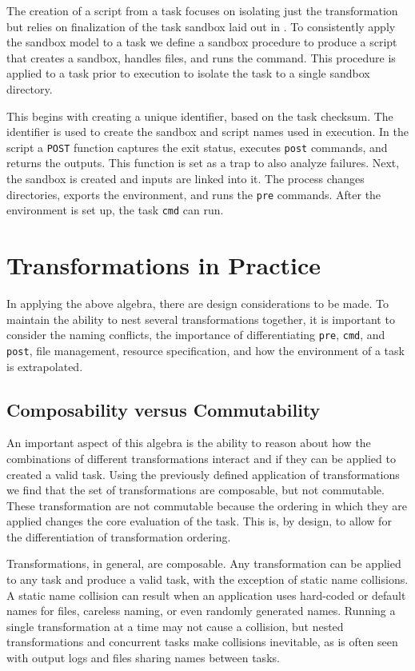 \documentclass[conference]{IEEEtran}
\begin{document}
The creation of a script from a task
focuses on isolating just the transformation
but relies on finalization of the task sandbox
laid out in .
To consistently apply the sandbox model to a task
we define a sandbox procedure to produce a script
that creates a sandbox, handles files, and runs
the command. This procedure is applied to a 
task prior to execution to isolate the task to 
a single sandbox directory.

This begins with 
creating a unique identifier, based on the task checksum.
The identifier is used to create the 
sandbox and script names used in execution. In the 
script a {\tt POST} function captures
the exit status, executes {\tt post} commands, and
returns the outputs. 
This function is set as a trap to
also analyze failures.
Next, the sandbox is created and 
inputs are linked into it. 
The process changes directories,
exports the environment, and
runs the {\tt pre} commands.
After the environment is set up,
the task {\tt cmd} can run.


\section{Transformations in Practice}

In applying the above algebra, there are
design considerations to be made.
To maintain the ability to nest several
transformations together, it is important
to consider the naming conflicts, the
importance of differentiating {\tt pre},
{\tt cmd}, and {\tt post}, file management,
resource specification, and how the 
environment of a task is extrapolated.

\subsection{ Composability versus Commutability }
An important aspect of this algebra is the ability
to reason about how the combinations of
different transformations interact and if they 
can be applied to created a valid task.
Using the previously defined application of
transformations we find that the set of transformations
are composable, but not commutable.
These transformation are not commutable because
the ordering in which they are applied changes the core 
evaluation of the task.
This is, by design, to allow for the differentiation
of transformation ordering.

Transformations, in general, are composable.
Any transformation can be
applied to any task and produce a valid task,
with the exception of static name collisions.
A static name collision can result when
an application uses hard-coded or 
default names for files, 
careless naming, or even randomly
generated names.
Running a single transformation at a time 
may not cause a collision,
but nested transformations and concurrent tasks 
make collisions inevitable, 
as is often seen with output logs
and files sharing names between tasks.
\end{document}
